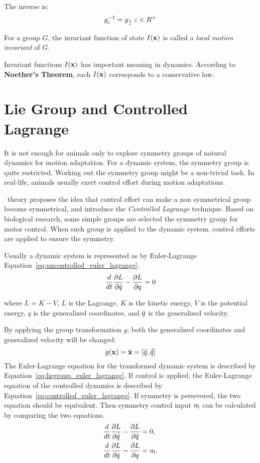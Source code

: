 The inverse is:
\[
g_{\varepsilon}^{-1}=g_{\frac{1}{\varepsilon}} \;\varepsilon \in R^+
\]

\begin{mydef}
For a group $G$, the invariant function of state $I(\mathbf{x})$ is called a \emph{local motion invariant} of $G$. 
\end{mydef}

Invariant functions $I(\mathbf{x})$ has important  meaning in dynamics. 
According  to \textbf{Noether's Theorem}, each $I(\mathbf{x})$ corresponds to a conservative law. 


\section{Lie Group and Controlled Lagrange}
\label{sec:liecontrol}
It is not enough for animals  only to  explore symmetry groups of natural dynamics for motion adaptation.
For a dynamic system, the symmetry group is quite restricted.  
Working out the symmetry group might be a non-trivial task.
In real-life, animals usually exert control effort during motion adaptations.

\moit\ theory proposes the idea that control effort can make a non symmetrical group become symmetrical, and introduce the \emph{Controlled Lagrange} technique.
Based on biological research\citep{flash2007affine}, some simple groups are selected the symmetry group for motor control.
When such group is applied to the dynamic system, control efforts are applied to ensure the symmetry.


Usually a dynamic system is represented as by Euler-Lagrange Equation~\ref{eq:uncontrolled_euler_lagrange}\citep{Goldstein2002}.
\begin{equation}
\frac{d}{dt} \frac{\partial L}{\partial \dot{q}} - \frac{\partial L}{\partial q} = 0
\label{eq:uncontrolled_euler_lagrange}
\end{equation}

where $L=K-V$, $L$ is the Lagrange, $K$ is the kinetic energy, $V$ is the potential energy, $q$ is the generalized coordinates, and $\dot{q}$ is the generalized velocity.

By applying the group transformation $g$, both the generalized coordinates and generalized velocity will be changed:
\[
g(\mathbf{x})=\tilde{\mathbf{x}}=[\tilde{q}, \dot{\tilde{q}}]
\]
The Euler-Lagrange equation for the transformed dynamic system is described by Equation~\ref{eq:liegroup_euler_lagrange}.
If control is applied, the Euler-Lagrange equation of the controlled dynamics is described by Equation~\ref{eq:controlled_euler_lagrange}. 
If symmetry is persevered, the two equation should be equivalent.
Then symmetry control input $u_{\mathrm{l}}$ can be calculated by comparing the two equations.
\begin{align}
\frac{d}{dt} \frac{\partial L}{\partial \dot{\tilde{q}}} - \frac{\partial L}{\partial \tilde{q} }&=0,\label{eq:liegroup_euler_lagrange}\\
\frac{d}{dt} \frac{\partial L}{\partial \dot{q}} - \frac{\partial L}{\partial q}&=u_{\mathrm{l}}. \label{eq:controlled_euler_lagrange}
\end{align}

